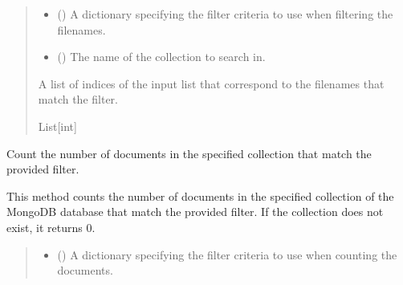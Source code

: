 \documentclass[letterpaper,10pt,english]{sphinxmanual}
\begin{document}
\begin{fulllineitems}
\begin{fulllineitems}
\begin{quote}
\begin{description}
\begin{itemize}
\item {} 
\sphinxAtStartPar
{} () \textendash{} A dictionary specifying the filter criteria to use when filtering the filenames.

\item {} 
\sphinxAtStartPar
{} () \textendash{} The name of the collection to search in.

\end{itemize}

\sphinxAtStartPar
A list of indices of the input list that correspond to the filenames that match the filter.

\sphinxAtStartPar
List{[}int{]}

\end{description}\end{quote}

\end{fulllineitems}


\begin{fulllineitems}
\label{\detokenize{forensicfit.database.database:forensicfit.database.database.Database.count_documents}}
\pysigstartsignatures
{}
\pysigstopsignatures
\sphinxAtStartPar
Count the number of documents in the specified collection that match the provided filter.

\sphinxAtStartPar
This method counts the number of documents in the specified collection of the MongoDB database
that match the provided filter. If the collection does not exist, it returns 0.
\begin{quote}\begin{description}
\sphinxAtStartPar
{}

\begin{itemize}
\item {} 
\sphinxAtStartPar
{} () \textendash{} A dictionary specifying the filter criteria to use when counting the documents.


\end{itemize}
\end{description}
\end{quote}
\end{fulllineitems}
\end{fulllineitems}
\end{document}
